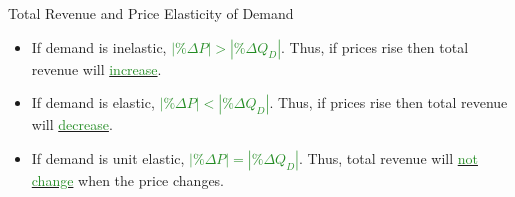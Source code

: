 \documentclass[xcolor={dvipsnames},pdf, hyperref={colorlinks=true, citecolor=ForestGreen, linkcolor=BlueViolet, urlcolor=Magenta}]{beamer}
\newcommand{\dd}[1]{{\underline{\textcolor{ForestGreen}{#1}}}}
\begin{document}
\begin{frame}{Total Revenue and Price Elasticity of Demand}
	
	\begin{itemize}
		\item If demand is inelastic, \dd{$|\% \Delta P| > |\%\Delta Q_D|$}. Thus, if prices rise then total revenue will \dd{increase}.
		
		\item If demand is elastic, \dd{$|\% \Delta P| < |\%\Delta Q_D|$}. Thus, if prices rise then total revenue will \dd{decrease}.
		
		
		\item If demand is unit elastic, \dd{$|\% \Delta P| = |\%\Delta Q_D|$}. Thus, total revenue will \dd{not change} when the price changes.
	\end{itemize}

		
\end{frame}
\end{document}
